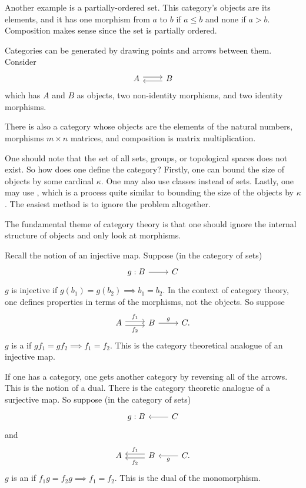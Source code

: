 \documentclass[11pt, twoside]{article}
\begin{document}
Another example is a partially-ordered set. \iffalse satisfying $a\leq a$ and 
$$
(a\leqslant b \land b\leqslant c) \implies a\leqslant c.
$$\fi
This category's objects are its elements, and it has one morphism from $a$ to $b$ if $a\leq b$ and none if $a>b$. Composition makes sense since the set is partially ordered.

Categories can be generated by drawing points and arrows between them. Consider 
\[
\begin{tikzcd}
A \arrow[r, shift left, ]& B\arrow[l, shift left, ]
\end{tikzcd}
\]
which has $A$ and $B$ as objects, two non-identity morphisms, and two identity morphisms.

There is also a category whose objects are the elements of the natural numbers, morphisms $m\times n$ matrices, and composition is matrix multiplication.

One should note that the set of all sets, groups, or topological spaces does not exist. So how does one define the category? Firstly, one can bound the size of objects by some cardinal $\kappa$. One may also use classes instead of sets. Lastly, one may use \href{https://en.wikipedia.org/wiki/Grothendieck_universe}{}, which is a process quite similar to bounding the size of the objects by $\kappa$. The easiest method is to ignore the problem altogether.

The fundamental theme of category theory is that one should ignore the internal structure of objects and only look at morphisms.

Recall the notion of an injective map. Suppose (in the category of sets)
\[
\begin{tikzcd}
g:B \ar[r]& C
\end{tikzcd}
\]
$g$ is injective if $g(b_1) = g(b_2) \implies b_1=b_2$. In the context of category theory, one defines properties in terms of the morphisms, not the objects. So suppose 
\[
\begin{tikzcd}
A \arrow[r, shift right, swap, "f_2"] \arrow[r, shift left, "f_1"]& B \arrow[r, "g"] & C.
\end{tikzcd}
\]
$g$ is a \href{https://en.wikipedia.org/wiki/Monomorphism}{} if $gf_1 = gf_2 \implies f_1=f_2$. This is the category theoretical analogue of an injective map.

If one has a category, one gets another category by reversing all of the arrows. This is the notion of a dual. There is the category theoretic analogue of a surjective map. So suppose (in the category of sets)
\[
\begin{tikzcd}
g:B &\ar[l] C
\end{tikzcd}
\]
and
\[
\begin{tikzcd}
A & B\arrow[l, shift right, swap, "f_1"] \arrow[l, shift left, "f_2"] & C \arrow[l, "g"].
\end{tikzcd}
\]
$g$ is an \href{https://en.wikipedia.org/wiki/Epimorphism}{} if $f_1g = f_2g \implies f_1=f_2$. This is the dual of the monomorphism.
\end{document}
